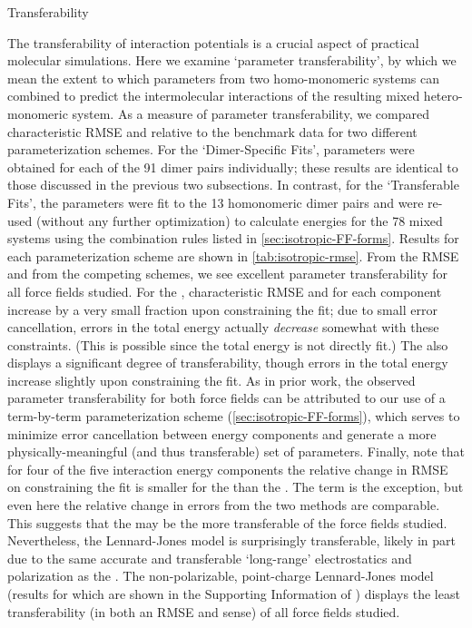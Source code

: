\begin{subsection}{Transferability}
\label{ss:transferability}

The transferability of interaction potentials is a crucial aspect of practical
molecular simulations. Here we examine `parameter transferability', by which
we mean the extent to which parameters from two homo-monomeric systems can
combined to predict the intermolecular interactions of the resulting mixed
hetero-monomeric system. 
As a measure of parameter transferability, we compared characteristic RMSE
and \mse relative to
the benchmark data for two different parameterization schemes.  For the
`Dimer-Specific Fits', \A parameters were obtained for each of the 91 dimer
pairs individually; these results are identical to those discussed in the
previous two subsections. In contrast, for the `Transferable Fits', the \A
parameters were fit to the 13 homonomeric dimer pairs and were re-used
(without any further optimization) to calculate energies for the 78 mixed
systems using the combination rules listed in \cref{sec:isotropic-FF-forms}.
Results for each parameterization scheme are shown in \cref{tab:isotropic-rmse}. 
From the RMSE and \mse from the competing schemes, 
we see excellent parameter transferability for all force fields studied. 
For the \isaffold, characteristic RMSE and \mse for each component increase by a very small
fraction upon constraining the fit; due to small error cancellation, errors in the
total energy actually \emph{decrease} somewhat with these constraints. 
(This is possible since the total energy is not directly fit.)
The \saptff also displays a significant degree of transferability, though
errors in the total energy increase slightly upon constraining the fit.
As in prior work, the observed parameter transferability for both force fields can be
attributed to our use of a term-by-term parameterization scheme
(\cref{sec:isotropic-FF-forms}),
which serves to minimize error cancellation between energy components and generate a
more physically-meaningful (and thus transferable) set of parameters.
\cite{McDaniel2013,McDaniel2012a}
Finally, note that for four of the five interaction energy components the relative
change in RMSE on constraining the fit is smaller for the \isaffold than
the \saptff. The \dhf term is the exception, but even here the relative 
change in errors from the two methods are comparable. This suggests that the
\isaffold may be the more transferable of the force fields studied.
Nevertheless, the Lennard-Jones model is surprisingly transferable,
likely in part due to the same accurate and transferable `long-range'
electrostatics and polarization as the \isaffold. The non-polarizable, point-charge
Lennard-Jones model (results for which are shown in the Supporting
Information of ) displays the least transferability (in both an RMSE and \mse
sense) of all force fields studied.


\end{subsection}
